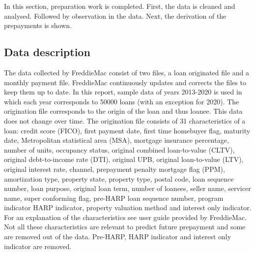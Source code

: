 In this section, preparation work is completed. First, the data is cleaned and analysed. Followed by observation in the data. Next, the derivation of the prepayments is shown.  

\subsection{Data description}
    The data collected by FreddieMac consist of two files, a loan originated file and a monthly payment file. FreddieMac continuously updates and corrects the files to keep them up to date. In this report, sample data of years 2013-2020 is used in which each year corresponds to 50000 loans (with an exception for 2020). The origination file corresponds to the origin of the loan and thus loanee. This data does not change over time. The origination file consists of 31 characteristics of a loan: credit score (FICO), first payment date, first time homebuyer flag, maturity date, Metropolitan statistical area (MSA), mortgage insurance percentage, number of units, occupancy status, original combined loan-to-value (CLTV), original debt-to-income rate (DTI), original UPB, original loan-to-value (LTV), original interest rate, channel, prepayment penalty mortgage flag (PPM), amortization type, property state, property type, postal code, loan sequence number, loan purpose, original loan term, number of loanees, seller name, servicer name, super conforming flag, pre-HARP loan sequence number, program indicator HARP indicator, property valuation method and interest only indicator. For an explanation of the characteristics see user guide provided by FreddieMac. Not all these characteristics are relevant to predict future prepayment and some are removed out of the data. Pre-HARP, HARP indicator and interest only indicator are removed.
    \\\\
